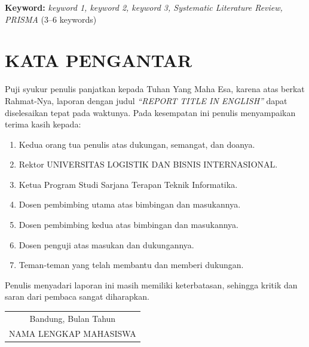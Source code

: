 \documentclass[12pt,a4paper,oneside]{report}
\newcommand{\judulEN}{REPORT TITLE IN ENGLISH}
\newcommand{\penulis}{NAMA LENGKAP MAHASISWA}
\newcommand{\universitas}{UNIVERSITAS LOGISTIK DAN BISNIS INTERNASIONAL}
\newcommand{\kota}{Bandung}
\newcommand{\bulantahun}{Bulan Tahun}
\begin{document}
\par\vspace{1em}
\noindent\textbf{Keyword:} \textit{keyword 1, keyword 2, keyword 3,
Systematic Literature Review, PRISMA} (3--6 keywords)

\chapter*{KATA PENGANTAR}
\justifying
Puji syukur penulis panjatkan kepada Tuhan Yang Maha Esa, karena atas berkat
Rahmat-Nya, laporan dengan judul \textit{``\judulEN''} dapat diselesaikan tepat
pada waktunya. Pada kesempatan ini penulis menyampaikan terima kasih kepada:

\begin{enumerate}[label=\arabic*., leftmargin=*, itemsep=2pt]
  \item Kedua orang tua penulis atas dukungan, semangat, dan doanya.
  \item Rektor \universitas.
  \item Ketua Program Studi Sarjana Terapan Teknik Informatika.
  \item Dosen pembimbing utama atas bimbingan dan masukannya.
  \item Dosen pembimbing kedua atas bimbingan dan masukannya.
  \item Dosen penguji atas masukan dan dukungannya.
  \item Teman-teman yang telah membantu dan memberi dukungan.
\end{enumerate}

Penulis menyadari laporan ini masih memiliki keterbatasan, sehingga kritik dan
saran dari pembaca sangat diharapkan.

\par\vspace{2em}
\hfill\begin{tabular}{c}\kota, \bulantahun\\[3em]\penulis\end{tabular}

\tableofcontents
\listoffigures
\listoftables
\end{document}
